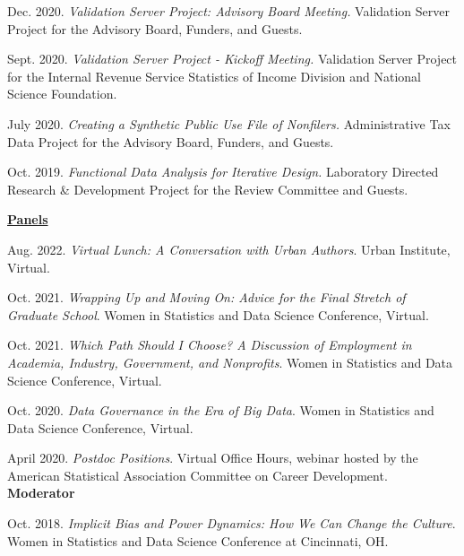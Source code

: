 \documentclass[11pt, letterpaper, roman]{moderncv} %
\begin{document}
\begin{etaremune}[topsep=0pt, itemsep=0.75pt, partopsep=0pt, parsep=0pt]
    \item Dec. 2020. \textit{Validation Server Project: Advisory Board Meeting.} Validation Server Project for the Advisory Board, Funders, and Guests.
    
    \item Sept. 2020. \textit{Validation Server Project - Kickoff Meeting.} Validation Server Project for the Internal Revenue Service Statistics of Income Division and National Science Foundation.
    
    \item July 2020. \textit{Creating a Synthetic Public Use File of Nonfilers.} Administrative Tax Data Project for the Advisory Board, Funders, and Guests.
    
    \item Oct. 2019. \textit{Functional Data Analysis for Iterative Design.} Laboratory Directed Research \& Development Project for the Review Committee and Guests.

\vspace{6pt}
\hspace{-0.30in}\underline{\textbf{\large Panels}}\normalsize
    \item Aug. 2022. \textit{Virtual Lunch: A Conversation with Urban Authors}. Urban Institute, Virtual.
    
    \item Oct. 2021. \textit{Wrapping Up and Moving On: Advice for the Final Stretch of Graduate School}. Women in Statistics and Data Science Conference, Virtual.
    
    \item Oct. 2021. \textit{Which Path Should I Choose? A Discussion of Employment in Academia, Industry, Government, and Nonprofits}. Women in Statistics and Data Science Conference, Virtual.
    
    \item Oct. 2020. \textit{Data Governance in the Era of Big Data}. Women in Statistics and Data Science Conference, Virtual.
    
    \item April 2020. \textit{Postdoc Positions}. Virtual Office Hours, webinar hosted by the American Statistical Association Committee on Career Development. \textbf{Moderator}
    
    \item Oct. 2018. \textit{Implicit Bias and Power Dynamics: How We Can Change the Culture}. Women in Statistics and Data Science Conference at Cincinnati, OH.


\end{etaremune}
\end{document}
